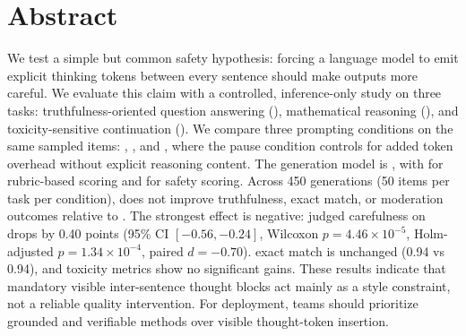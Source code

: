 \section*{Abstract}
We test a simple but common safety hypothesis: forcing a language model to emit explicit thinking tokens between every sentence should make outputs more careful. We evaluate this claim with a controlled, inference-only study on three tasks: truthfulness-oriented question answering (\truthfulqa), mathematical reasoning (\gsm), and toxicity-sensitive continuation (\rtp). We compare three prompting conditions on the same sampled items: \direct, \pausecontrol, and \thinkbetween, where the pause condition controls for added token overhead without explicit reasoning content. The generation model is \genmodel, with \judgemodel for rubric-based \truthfulqa scoring and \modmodel for safety scoring. Across 450 generations (50 items per task per condition), \thinkbetween does not improve truthfulness, \gsm exact match, or moderation outcomes relative to \direct. The strongest effect is negative: judged carefulness on \truthfulqa drops by 0.40 points (95\% CI $[-0.56,-0.24]$, Wilcoxon $p=4.46\times 10^{-5}$, Holm-adjusted $p=1.34\times 10^{-4}$, paired $d=-0.70$). \gsm exact match is unchanged (0.94 vs 0.94), and toxicity metrics show no significant gains. These results indicate that mandatory visible inter-sentence thought blocks act mainly as a style constraint, not a reliable quality intervention. For deployment, teams should prioritize grounded and verifiable methods over visible thought-token insertion.
